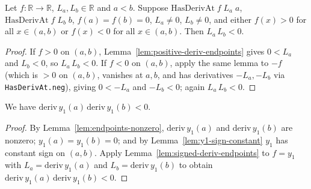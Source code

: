 \begin{lemma}
    \label{lem:signed-deriv-endpoints}
    \leanok
    Let $f : \mathbb{R} \to \mathbb{R}$, $L_a, L_b \in \mathbb{R}$ and $a < b$.
    Suppose $\mathrm{HasDerivAt}\;f\;L_a\;a$, $\mathrm{HasDerivAt}\;f\;L_b\;b$,
    $f(a) = f(b) = 0$, $L_a \ne 0$, $L_b \ne 0$, and either $f(x) > 0$ for all
    $x \in (a,b)$ or $f(x) < 0$ for all $x \in (a,b)$. Then $L_a\,L_b < 0$.
\end{lemma}
\begin{proof}
    If $f > 0$ on $(a,b)$, Lemma~\ref{lem:positive-deriv-endpoints} gives
    $0 < L_a$ and $L_b < 0$, so $L_a\,L_b < 0$. If $f < 0$ on $(a,b)$, apply the
    same lemma to $-f$ (which is $> 0$ on $(a,b)$, vanishes at $a, b$, and has
    derivatives $-L_a, -L_b$ via \texttt{HasDerivAt.neg}), giving $0 < -L_a$ and
    $-L_b < 0$; again $L_a\,L_b < 0$.
\end{proof}

\begin{lemma}
    \label{lem:y1-deriv-opposite}
    \leanok
    We have $\mathrm{deriv}\,y_1(a)\,\mathrm{deriv}\,y_1(b) < 0$.
\end{lemma}
\begin{proof}
    By Lemma~\ref{lem:endpoints-nonzero}, $\mathrm{deriv}\,y_1(a)$ and
    $\mathrm{deriv}\,y_1(b)$ are nonzero; $y_1(a) = y_1(b) = 0$; and by
    Lemma~\ref{lem:y1-sign-constant} $y_1$ has constant sign on $(a,b)$. Apply
    Lemma~\ref{lem:signed-deriv-endpoints} to $f = y_1$ with
    $L_a = \mathrm{deriv}\,y_1(a)$ and $L_b = \mathrm{deriv}\,y_1(b)$ to obtain
    $\mathrm{deriv}\,y_1(a)\,\mathrm{deriv}\,y_1(b) < 0$.
\end{proof}

